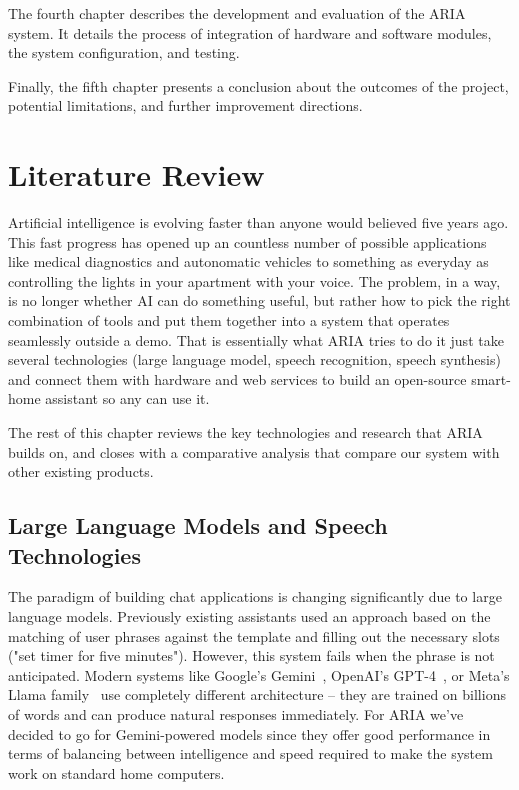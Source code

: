 The fourth chapter describes the development and evaluation of the ARIA system. It details the process of integration of hardware and software modules, the system configuration, and testing.

Finally, the fifth chapter presents a conclusion about the outcomes of the project, potential limitations, and further improvement directions.


\chapter{Literature Review}

Artificial intelligence is evolving faster than anyone would believed
five years ago. This fast progress has opened up an countless
number of possible applications like medical diagnostics and autonomatic vehicles to
something as everyday as controlling the lights in your apartment with your voice.
The problem, in a way, is no longer whether AI can do something useful, but
rather how to pick the right combination of tools and put them together into a system
that operates seamlessly outside a demo. That is essentially what ARIA tries to
do it just take several technologies (large language model, speech recognition,
speech synthesis) and connect them with hardware and web services to build
an open-source smart-home assistant so any can use it. 

The rest of this chapter reviews the key technologies and research that ARIA builds
on, and closes with a comparative analysis that compare our system with other existing products.


\section{Large Language Models and Speech Technologies}


The paradigm of building chat applications is changing significantly due to large language models. Previously existing assistants used an approach based on the matching of user phrases against the template and filling out the necessary slots ("set timer for five minutes"). However, this system fails when the phrase is not anticipated. Modern systems like Google's Gemini~\cite{gemini-api}, OpenAI's GPT-4~\cite{openai-gpt4}, or Meta's Llama family~\cite{touvron-llama} use completely different architecture – they are trained on billions of words and can produce natural responses immediately. For ARIA we've decided to go for Gemini-powered models since they offer good performance in terms of balancing between intelligence and speed required to make the system work on standard home computers.

